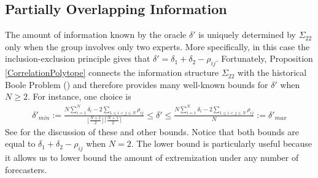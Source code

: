 \documentclass[11pt]{article}
\theoremstyle{definition}
\theoremstyle{definition}
\begin{document}
\subsection{Partially Overlapping Information}
\label{compound}

The amount of information known by the oracle $\delta'$ is uniquely
determined by $\Sigma_{22}$ only when the group involves only two
experts. More specifically, in this case the inclusion-exclusion
principle gives that $\delta' = \delta_1 + \delta_2 -
\rho_{ij}$. Fortunately, Proposition \ref{CorrelationPolytope}
connects the information structure $\Sigma_{22}$ with the historical
Boole Problem (\citealt{boole1854investigation}) and therefore
provides many well-known bounds for $\delta'$ when $N \geq 2$. For
instance, one choice is
\begin{align*}
\delta'_{min} := \frac{N \sum_{i=1}^N \delta_i - 2 \sum_{1 \leq i < j \leq N} \rho_{ij}}{\lfloor \frac{N+1}{2} \rfloor \lceil \frac{N+1}{2} \rceil }  \leq \delta' \leq \frac{N \sum_{i=1}^N \delta_i - 2 \sum_{1 \leq i < j \leq N} \rho_{ij}}{N} := \delta'_{max}
\end{align*}
See \citealt{deza1997geometry} for the discussion of these and other
bounds. Notice that both bounds are equal to $\delta_1 + \delta_2 -
\rho_{ij}$ when $N=2$. The lower bound is particularly useful because
it allows us to lower bound the amount of extremization under any
number of forecasters.
\end{document}
